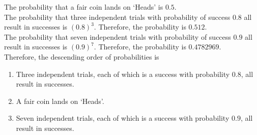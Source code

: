 \documentclass[fleqn, a4paper, 11pt, oneside]{amsart}
\theoremstyle{definition}
\theoremstyle{theorem}
\begin{document}
\begin{solution}
	The probability that a fair coin lands on `Heads' is $0.5$.\\
	The probability that three independent trials with probability of success $0.8$ all result in successes is $(0.8)^3$.
	Therefore, the probability is $0.512$.\\
	The probability that seven independent trials with probability of success $0.9$ all result in successes is $(0.9)^7$.
	Therefore, the probability is $0.4782969$.\\
	Therefore, the descending order of probabilities is
	\begin{enumerate}
		\item Three independent trials, each of which is a success with probability $0.8$, all result in successes.
		\item A fair coin lands on `Heads'.
		\item Seven independent trials, each of which is a success with probability $0.9$, all result in successes.
	\end{enumerate}
\end{solution}
\end{document}
